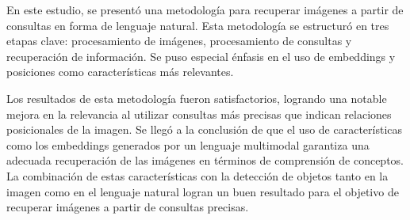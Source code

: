 \begin{conclusions}
    En este estudio, se presentó una metodología para recuperar imágenes a partir de consultas en forma de lenguaje natural. Esta metodología se estructuró en tres etapas clave: procesamiento de imágenes, procesamiento de consultas y recuperación de información. Se puso especial énfasis en el uso de embeddings y posiciones como características más relevantes.
    
    Los resultados de esta metodología fueron satisfactorios, logrando una notable mejora en la relevancia al utilizar consultas más precisas que indican relaciones posicionales de la imagen. Se llegó a la conclusión de que el uso de características como los embeddings generados por un lenguaje multimodal garantiza una adecuada recuperación de las imágenes en términos de comprensión de conceptos. La combinación de estas características con la detección de objetos tanto en la imagen como en el lenguaje natural logran un buen resultado para el objetivo de recuperar imágenes a partir de consultas precisas.
    \end{conclusions}
    
    